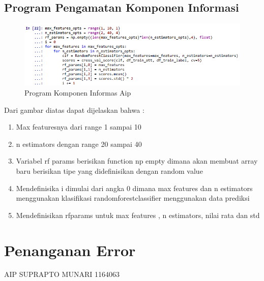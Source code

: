 \subsection{Program Pengamatan Komponen Informasi}
\begin{figure}[!hbtp]
\centering
\includegraphics[scale=0.5]{figures/AIP/c11.PNG}
\caption{Program Komponen Informas Aip}
\label{Praktek}
\end{figure}
Dari gambar diatas dapat dijelaskan bahwa :
\begin{enumerate}
\item Max featuresnya dari range 1 sampai 10
\item n estimators dengan range 20 sampai 40
\item Variabel rf params berisikan function np empty dimana akan membuat array baru berisikan tipe yang didefinisikan dengan random value
\item Mendefinisika i dimulai dari angka 0 dimana max features dan n estimators menggunakan klasifikasi randomforestclassifier menggunakan data prediksi
\item Mendefinisikan rfparams untuk max features , n estimators, nilai rata dan std
\end{enumerate}

\section{Penanganan Error}
AIP SUPRAPTO MUNARI 1164063
